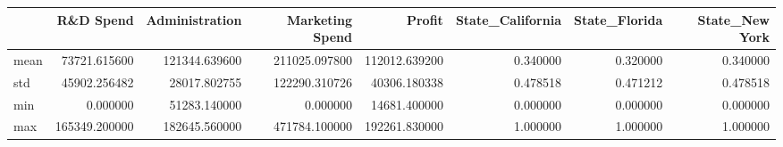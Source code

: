 \begin{tabular}{lrrrrrrr}
\toprule
{} &      R\&D Spend &  Administration &  Marketing Spend &         Profit &  State\_California &  State\_Florida &  State\_New York \\
\midrule
mean &   73721.615600 &   121344.639600 &    211025.097800 &  112012.639200 &          0.340000 &       0.320000 &        0.340000 \\
std  &   45902.256482 &    28017.802755 &    122290.310726 &   40306.180338 &          0.478518 &       0.471212 &        0.478518 \\
min  &       0.000000 &    51283.140000 &         0.000000 &   14681.400000 &          0.000000 &       0.000000 &        0.000000 \\
max  &  165349.200000 &   182645.560000 &    471784.100000 &  192261.830000 &          1.000000 &       1.000000 &        1.000000 \\
\bottomrule
\end{tabular}
